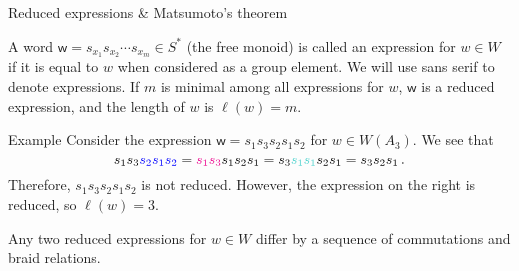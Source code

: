 \documentclass[9pt]{beamer}
\newcommand{\supp}{\operatorname{supp}}
\newcommand{\w}{{\textsf{w}}}
\begin{document}
%    
%
%


\begin{frame}{Reduced expressions \& Matsumoto's theorem}

\begin{definition}
A word $\w = s_{x_1}s_{x_2}\cdots s_{x_m}\in S^{*}$ (the free monoid) is called an \alert{expression} for $w\in W$ if it is equal to $w$ when considered as a group element. We will use {\textsf{sans serif}} to denote expressions.
    If $m$ is minimal among all expressions for $w$, $\w$ is a \alert{reduced expression}, and the \alert{length} of $w$ is $\ell(w)=m$.
\end{definition}

\pause
    
\begin{block}{Example}
Consider the expression $\w = s_1s_3s_2s_1s_2$ for $w \in W(A_3)$. We see that
	$$s_1s_3{\color{blue}s_2s_1s_2}={\color{magenta}s_1s_3}s_1s_2s_1=s_3{\color{turq}s_1s_1}s_2s_1=s_3s_2s_1\,.$$
    Therefore, $s_1s_3s_2s_1s_2$ is not reduced. However, the expression on the right is reduced, so $\ell(w)=3$.
\end{block}

\pause

\begin{theorem}[Matsumoto]
Any two reduced expressions for $w\in W$ differ by a sequence of commutations and braid relations.
\end{theorem}
\end{frame}
\end{document}

